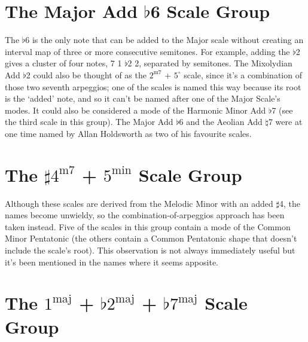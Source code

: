 \documentclass[english]{./gbook}
\begin{document}
\begin{large}
\section{The Major Add $\flat$6 Scale Group}
The $\flat$6 is the only note that can be added to the Major scale without creating an interval map of three or more consecutive semitones. For example, adding the $\flat$2 gives a cluster of four notes, 7 1 $\flat$2 2, separated by semitones. The Mixolydian Add $\flat$2 could also be thought of as the $2^{\text{m7}}$ + $5^\circ$ scale, since it's a combination of those two seventh arpeggios; one of the scales is named this way because its root is the `added' note, and so it can't be named after one of the Major Scale's modes. It could also be considered a mode of the Harmonic Minor Add $\flat$7 (see the third scale in this group). The Major Add $\flat$6 and the Aeolian Add $\natural$7 were at one time named by Allan Holdsworth as two of his favourite scales.


\section{The $\sharp 4^{\text{m7}}$ + $5^{\text{min}}$ Scale Group}

Although these scales are derived from the Melodic Minor with an added $\sharp$4, the names become unwieldy, so the combination-of-arpeggios approach has been taken instead. Five of the scales in this group contain a mode of the Common Minor Pentatonic (the others contain a Common Pentatonic shape that doesn't include the scale's root). This observation is not always immediately useful but it's been mentioned in the names where it seems apposite.


\section{The $1^{\text{maj}}$ + $\flat 2^{\text{maj}}$ + $\flat 7^{\text{maj}}$ Scale Group}


\end{large}
\end{document}
